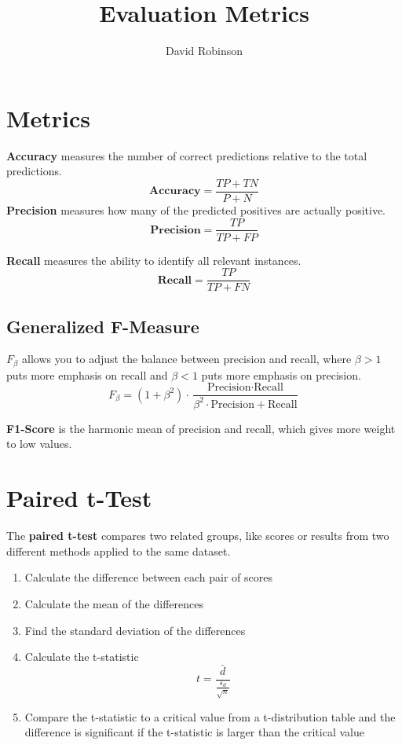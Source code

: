 \documentclass{article}
\title{Evaluation Metrics}
\author{David Robinson}
\date{}
\begin{document}
\maketitle

\section*{Metrics}

\textbf{Accuracy} measures the number of correct predictions relative to the total predictions.
\[\textbf{Accuracy}=\frac{TP+TN}{P+N}\]
\textbf{Precision} measures how many of the predicted positives are actually positive.
\[\textbf{Precision}=\frac{TP}{TP+FP}\]

\textbf{Recall} measures the ability to identify all relevant instances.
\[\textbf{Recall}=\frac{TP}{TP+FN}\]

\subsection*{Generalized F\bm{$\beta$}-Measure}
$F_\beta$ allows you to adjust the balance between precision and recall, where $\beta > 1$ puts more emphasis on recall and $\beta < 1$ puts more emphasis on precision.
\[F_\beta = (1+\beta^2)\cdot\frac{\text{Precision}\cdot\text{Recall}}{\beta^2\cdot\text{Precision}+\text{Recall}}\]

\textbf{F1-Score} is the harmonic mean of precision and recall, which gives more weight to low values.

\section*{Paired t-Test}

The \textbf{paired t-test} compares two related groups, like scores or results from two different methods applied to the same dataset.
\begin{enumerate}
    \item Calculate the difference between each pair of scores
    \item Calculate the mean of the differences
    \item Find the standard deviation of the differences
    \item Calculate the t-statistic
    \[t=\frac{\bar{d}}{\frac{s_d}{\sqrt{n}}}\]
    \item Compare the t-statistic to a critical value from a t-distribution table and the difference is significant if the t-statistic is larger than the critical value
\end{enumerate}
\end{document}
